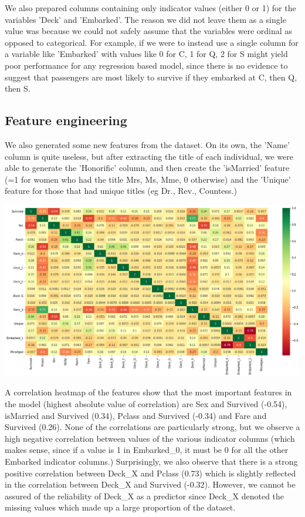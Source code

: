 \documentclass[12pt]{article}
\begin{document}
We also prepared columns containing only indicator values (either 0 or 1) for the variables 'Deck' and 'Embarked'. The reason we did not leave them as a single value was because we could not safely assume that the variables were ordinal as opposed to categorical. For example, if we were to instead use a single column for a variable like 'Embarked' with values like 0 for C, 1 for Q, 2 for S might yield poor performance for any regression based model, since there is no evidence to suggest that passengers are most likely to survive if they embarked at C, then Q, then S.

\subsection{Feature engineering}

We also generated some new features from the dataset. On its own, the 'Name' column is quite useless, but after extracting the title of each individual, we were able to generate the 'Honorific' column, and then create the 'isMarried' feature (=1 for women who had the title Mrs, Ms, Mme, 0 otherwise) and the 'Unique' feature for those that had unique titles (eg Dr., Rev., Countess.)\newline

\includegraphics[scale=0.4]{corr_heatmap}

A correlation heatmap of the features show that the most important features in the model (highest absolute value of correlation) are Sex and Survived (-0.54), isMarried and Survived (0.34), Pclass and Survived (-0.34) and Fare and Survived (0.26). None of the correlations are particularly strong, but we observe a high negative correlation between values of the various indicator columns (which makes sense, since if a value is 1 in Embarked\_0, it must be 0 for all the other Embarked indicator columns.) Surprisingly, we also observe that there is a strong positive correlation between Deck\_X and Pclass (0.73) which is slightly reflected in the correlation between Deck\_X and Survived (-0.32). However, we cannot be assured of the reliability of Deck\_X as a predictor since Deck\_X denoted the missing values which made up a large proportion of the dataset.
\end{document}
